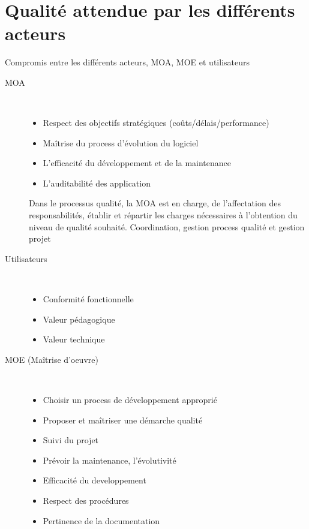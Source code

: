 \section{Qualité attendue par les différents acteurs}

Compromis entre les différents acteurs, MOA, MOE et utilisateurs

\begin{description}

    \item[MOA]\hfill\\
		\begin{itemize}
		\item Respect des objectifs stratégiques (coûts/délais/performance)
		\item Maîtrise du process d’évolution du logiciel
		\item L’efficacité du développement et de la maintenance
		\item L’auditabilité des application
		\end{itemize}

		Dans le processus qualité, la MOA est en charge, de l’affectation des responsabilités, établir et répartir les charges nécessaires à l’obtention du niveau de qualité souhaité.
		Coordination, gestion process qualité et gestion projet

	\item[Utilisateurs]\hfill\\
		\begin{itemize}
		\item Conformité fonctionnelle
		\item Valeur pédagogique
		\item Valeur technique
		\end{itemize}

	\item[MOE (Maîtrise d'oeuvre)]\hfill\\
		\begin{itemize}
		\item Choisir un process de développement approprié
		\item Proposer et maîtriser une démarche qualité
		\item Suivi du projet
		\item Prévoir la maintenance, l’évolutivité
		\item Efficacité du developpement
		\item Respect des procédures
		\item Pertinence de la documentation
		\end{itemize}
		
\end{description}




